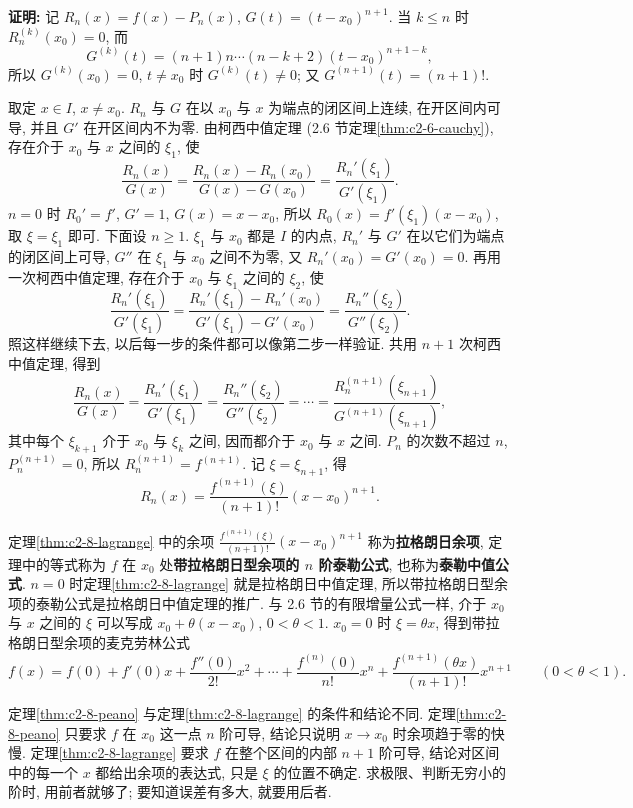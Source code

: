 \documentclass[UTF8,openany]{ctexbook}
\theoremstyle{chinesetextbook}
\newenvironment{cnproof}{\par\indent\textbf{证明:} \ignorespaces}{\par}
\begin{document}
\begin{cnproof}
记 $R_n(x)=f(x)-P_n(x)$, $G(t)=(t-x_0)^{n+1}$. 当 $k\le n$ 时 $R_n^{(k)}(x_0)=0$, 而
\[
G^{(k)}(t)=(n+1)n\cdots(n-k+2)(t-x_0)^{n+1-k},
\]
所以 $G^{(k)}(x_0)=0$, $t\ne x_0$ 时 $G^{(k)}(t)\ne0$; 又 $G^{(n+1)}(t)=(n+1)!$.

取定 $x\in I$, $x\ne x_0$. $R_n$ 与 $G$ 在以 $x_0$ 与 $x$ 为端点的闭区间上连续, 在开区间内可导, 并且 $G'$ 在开区间内不为零. 由柯西中值定理 (2.6 节定理\ref{thm:c2-6-cauchy}), 存在介于 $x_0$ 与 $x$ 之间的 $\xi_1$, 使
\[
\frac{R_n(x)}{G(x)}=\frac{R_n(x)-R_n(x_0)}{G(x)-G(x_0)}=\frac{R_n'(\xi_1)}{G'(\xi_1)}.
\]
$n=0$ 时 $R_0'=f'$, $G'=1$, $G(x)=x-x_0$, 所以 $R_0(x)=f'(\xi_1)(x-x_0)$, 取 $\xi=\xi_1$ 即可. 下面设 $n\ge1$. $\xi_1$ 与 $x_0$ 都是 $I$ 的内点, $R_n'$ 与 $G'$ 在以它们为端点的闭区间上可导, $G''$ 在 $\xi_1$ 与 $x_0$ 之间不为零, 又 $R_n'(x_0)=G'(x_0)=0$. 再用一次柯西中值定理, 存在介于 $x_0$ 与 $\xi_1$ 之间的 $\xi_2$, 使
\[
\frac{R_n'(\xi_1)}{G'(\xi_1)}=\frac{R_n'(\xi_1)-R_n'(x_0)}{G'(\xi_1)-G'(x_0)}=\frac{R_n''(\xi_2)}{G''(\xi_2)}.
\]
照这样继续下去, 以后每一步的条件都可以像第二步一样验证. 共用 $n+1$ 次柯西中值定理, 得到
\[
\frac{R_n(x)}{G(x)}=\frac{R_n'(\xi_1)}{G'(\xi_1)}=\frac{R_n''(\xi_2)}{G''(\xi_2)}=\cdots=\frac{R_n^{(n+1)}(\xi_{n+1})}{G^{(n+1)}(\xi_{n+1})},
\]
其中每个 $\xi_{k+1}$ 介于 $x_0$ 与 $\xi_k$ 之间, 因而都介于 $x_0$ 与 $x$ 之间. $P_n$ 的次数不超过 $n$, $P_n^{(n+1)}=0$, 所以 $R_n^{(n+1)}=f^{(n+1)}$. 记 $\xi=\xi_{n+1}$, 得
\[
R_n(x)=\frac{f^{(n+1)}(\xi)}{(n+1)!}(x-x_0)^{n+1}.
\]
\end{cnproof}
定理\ref{thm:c2-8-lagrange} 中的余项 $\displaystyle\frac{f^{(n+1)}(\xi)}{(n+1)!}(x-x_0)^{n+1}$ 称为\textbf{拉格朗日余项}, 定理中的等式称为 $f$ 在 $x_0$ 处\textbf{带拉格朗日型余项的 $n$ 阶泰勒公式}, 也称为\textbf{泰勒中值公式}. $n=0$ 时定理\ref{thm:c2-8-lagrange} 就是拉格朗日中值定理, 所以带拉格朗日型余项的泰勒公式是拉格朗日中值定理的推广. 与 2.6 节的有限增量公式一样, 介于 $x_0$ 与 $x$ 之间的 $\xi$ 可以写成 $x_0+\theta(x-x_0)$, $0<\theta<1$. $x_0=0$ 时 $\xi=\theta x$, 得到带拉格朗日型余项的麦克劳林公式
\[
f(x)=f(0)+f'(0)x+\frac{f''(0)}{2!}x^2+\cdots+\frac{f^{(n)}(0)}{n!}x^n+\frac{f^{(n+1)}(\theta x)}{(n+1)!}x^{n+1}\qquad(0<\theta<1).
\]

定理\ref{thm:c2-8-peano} 与定理\ref{thm:c2-8-lagrange} 的条件和结论不同. 定理\ref{thm:c2-8-peano} 只要求 $f$ 在 $x_0$ 这一点 $n$ 阶可导, 结论只说明 $x\to x_0$ 时余项趋于零的快慢. 定理\ref{thm:c2-8-lagrange} 要求 $f$ 在整个区间的内部 $n+1$ 阶可导, 结论对区间中的每一个 $x$ 都给出余项的表达式, 只是 $\xi$ 的位置不确定. 求极限、判断无穷小的阶时, 用前者就够了; 要知道误差有多大, 就要用后者.
\end{document}
